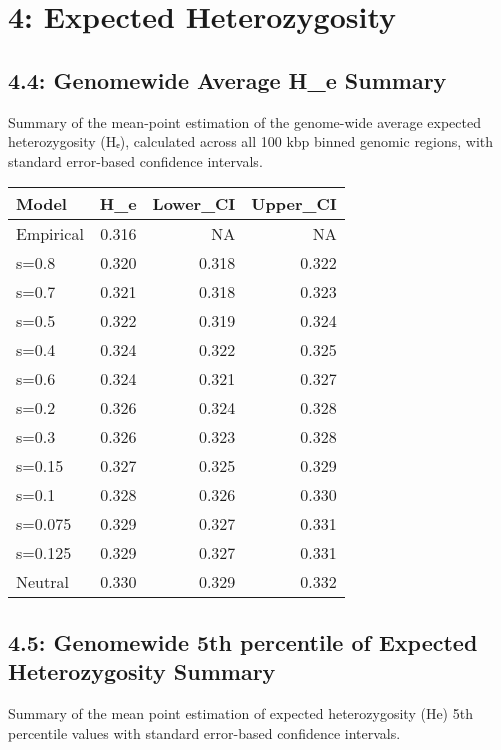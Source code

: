\documentclass[
]{article}
\begin{document}
\section{4: Expected Heterozygosity}\label{expected-heterozygosity}

\subsection{4.4: Genomewide Average H\_e
Summary}\label{genomewide-average-h_e-summary}

Summary of the mean-point estimation of the genome-wide average expected
heterozygosity (Hₑ), calculated across all 100 kbp binned genomic
regions, with standard error-based confidence intervals.

\begin{longtable}[]{@{}lrrr@{}}
\toprule\noalign{}
Model & H\_e & Lower\_CI & Upper\_CI \\
\midrule\noalign{}
\endhead
\bottomrule\noalign{}
\endlastfoot
Empirical & 0.316 & NA & NA \\
s=0.8 & 0.320 & 0.318 & 0.322 \\
s=0.7 & 0.321 & 0.318 & 0.323 \\
s=0.5 & 0.322 & 0.319 & 0.324 \\
s=0.4 & 0.324 & 0.322 & 0.325 \\
s=0.6 & 0.324 & 0.321 & 0.327 \\
s=0.2 & 0.326 & 0.324 & 0.328 \\
s=0.3 & 0.326 & 0.323 & 0.328 \\
s=0.15 & 0.327 & 0.325 & 0.329 \\
s=0.1 & 0.328 & 0.326 & 0.330 \\
s=0.075 & 0.329 & 0.327 & 0.331 \\
s=0.125 & 0.329 & 0.327 & 0.331 \\
Neutral & 0.330 & 0.329 & 0.332 \\
\end{longtable}

\subsection{4.5: Genomewide 5th percentile of Expected Heterozygosity
Summary}\label{genomewide-5th-percentile-of-expected-heterozygosity-summary}

Summary of the mean point estimation of expected heterozygosity (He) 5th
percentile values with standard error-based confidence intervals.
\end{document}
